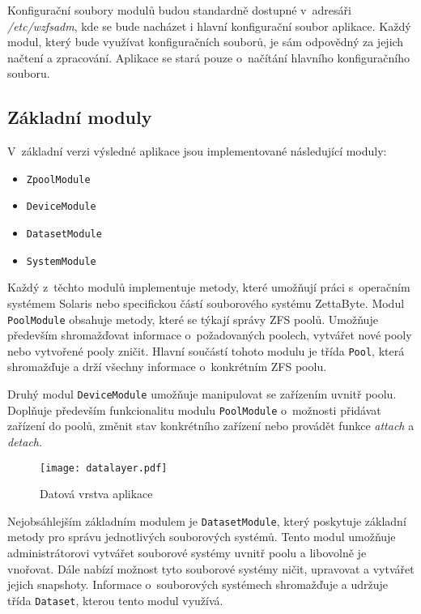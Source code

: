     Konfigurační soubory modulů budou standardně dostupné v~adresáři \emph{/etc/wzfsadm}, kde se bude nacházet i hlavní konfigurační soubor aplikace. Každý modul, který bude využívat konfiguračních souborů, je sám odpovědný za jejich načtení a zpracování. Aplikace se stará pouze o~načítání hlavního konfiguračního souboru.

    \subsection{Základní moduly}
    V~základní verzi výsledné aplikace jsou implementované následující moduly:
    \begin{itemize}
      \item \verb|ZpoolModule|
      \item \verb|DeviceModule|
      \item \verb|DatasetModule|
      \item \verb|SystemModule|
    \end{itemize}

    Každý z~těchto modulů implementuje metody, které umožňují práci s~operačním systémem Solaris nebo specifickou částí souborového systému ZettaByte. Modul \verb|PoolModule| obsahuje metody, které se týkají správy ZFS poolů. Umožňuje především shromažďovat informace o~požadovaných poolech, vytvářet nové pooly nebo vytvořené pooly zničit. Hlavní součástí tohoto modulu je třída \verb|Pool|, která shromažďuje a drží všechny informace o~konkrétním ZFS poolu.

    Druhý modul \verb|DeviceModule| umožňuje manipulovat se zařízením uvnitř poolu. Doplňuje především funkcionalitu modulu \verb|PoolModule| o~možnosti přidávat zařízení do poolů, změnit stav konkrétního zařízení nebo provádět funkce \emph{attach} a \emph{detach}.

    \begin{figure}
        \centering
        \texttt{[image: datalayer.pdf]}
        \caption{Datová vrstva aplikace}
        \label{datalayer}
    \end{figure}

    Nejobsáhlejším základním modulem je \verb|DatasetModule|, který poskytuje základní metody pro správu jednotlivých souborových systémů. Tento modul umožňuje administrátorovi vytvářet souborové systémy uvnitř poolu a libovolně je vnořovat. Dále nabízí možnost tyto souborové systémy ničit, upravovat a vytvářet jejich snapshoty. Informace o~souborových systémech shromažďuje a udržuje třída \verb|Dataset|, kterou tento modul využívá.

